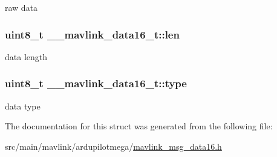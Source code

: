 raw data 

\hypertarget{struct____mavlink__data16__t_a0e76a775ee751058f04d45e32a53531a}{
\subsubsection[{len}]{\setlength{\rightskip}{0pt plus 5cm}uint8\+\_\+t \+\_\+\+\_\+mavlink\+\_\+data16\+\_\+t\+::len}}\label{struct____mavlink__data16__t_a0e76a775ee751058f04d45e32a53531a}


data length 

\hypertarget{struct____mavlink__data16__t_add5872e4917638939b99c745df4ce051}{
\subsubsection[{type}]{\setlength{\rightskip}{0pt plus 5cm}uint8\+\_\+t \+\_\+\+\_\+mavlink\+\_\+data16\+\_\+t\+::type}}\label{struct____mavlink__data16__t_add5872e4917638939b99c745df4ce051}


data type 



The documentation for this struct was generated from the following file\+:\begin{DoxyCompactItemize}
\item 
src/main/mavlink/ardupilotmega/\hyperlink{mavlink__msg__data16_8h}{mavlink\+\_\+msg\+\_\+data16.\+h}\end{DoxyCompactItemize}
